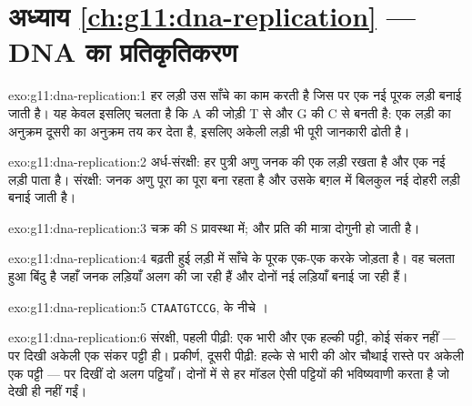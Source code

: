 \section*{अध्याय \ref{ch:g11:dna-replication} --- DNA का प्रतिकृतिकरण}

\begin{solution}{exo:g11:dna-replication:1}
हर लड़ी उस साँचे का काम करती है जिस पर एक नई पूरक लड़ी बनाई जाती है। यह
केवल इसलिए चलता है कि A की जोड़ी T से और G की C से बनती है: एक लड़ी का
अनुक्रम दूसरी का अनुक्रम तय कर देता है, इसलिए अकेली लड़ी भी पूरी जानकारी
ढोती है।
\end{solution}

\begin{solution}{exo:g11:dna-replication:2}
अर्ध-संरक्षी: हर पुत्री अणु जनक की एक लड़ी रखता है और एक नई लड़ी पाता
है। संरक्षी: जनक अणु पूरा का पूरा बना रहता है और उसके बग़ल में बिलकुल नई
दोहरी लड़ी बनाई जाती है।
\end{solution}

\begin{solution}{exo:g11:dna-replication:3}
 चक्र की S प्रावस्था में; और प्रति   की मात्रा दोगुनी हो
जाती है।
\end{solution}

\begin{solution}{exo:g11:dna-replication:4}
 बढ़ती हुई लड़ी में साँचे के पूरक  एक-एक करके
जोड़ता है।  वह चलता हुआ बिंदु है जहाँ जनक लड़ियाँ अलग
की जा रही हैं और दोनों नई लड़ियाँ बनाई जा रही हैं।
\end{solution}

\begin{solution}{exo:g11:dna-replication:5}
\texttt{CTAATGTCCG},  के नीचे ।
\end{solution}

\begin{solution}{exo:g11:dna-replication:6}
संरक्षी, पहली पीढ़ी: एक भारी और एक हल्की पट्टी, कोई संकर नहीं --- पर
दिखी अकेली एक संकर पट्टी ही। प्रकीर्ण, दूसरी पीढ़ी: हल्के से भारी की ओर
चौथाई रास्ते पर अकेली एक पट्टी --- पर दिखीं दो अलग पट्टियाँ। दोनों में से
हर मॉडल ऐसी पट्टियों की भविष्यवाणी करता है जो देखी ही नहीं गईं।
\end{solution}

